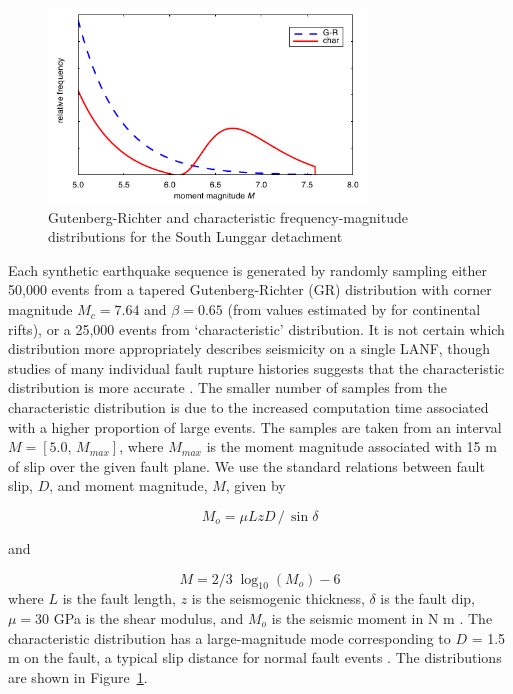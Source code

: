 \documentclass[twocolumn,grl]{AGUTeX}
\begin{document}
\begin{article}
\begin{figure}[b]
\noindent\includegraphics[width=20pc]{./figures/F-Ms.pdf}
\caption{Gutenberg-Richter and characteristic frequency-magnitude 
 		 distributions for the South Lunggar detachment}
\label{fig:fms}
\end{figure}

Each synthetic earthquake sequence is generated by randomly sampling either
50,000 events from a tapered Gutenberg-Richter (GR) distribution with corner
magnitude $M_c = 7.64$ and $\beta = 0.65$ (from values estimated by
\citet{birdkagan2004f_m} for continental rifts), or a 25,000 events from
`characteristic' distribution. It is not certain which distribution more
appropriately describes seismicity on a single LANF, though studies of many
individual fault rupture histories suggests that the characteristic
distribution is more accurate \citep{hecker2013eqdist}.  The smaller number of
samples from the characteristic distribution is due to the increased
computation time associated with a higher proportion of large events.  The
samples are taken from an interval $M = [5.0, \, M_{max}]$, where $M_{max}$ is
the moment magnitude associated with 15 m of slip over the given fault plane.
We use the standard relations between fault slip, $D$, and moment magnitude,
$M$, given by

\begin{equation}
 M_o = \mu L z D \,/ \, \sin \delta 
 \end{equation}

and

\begin{equation}
M = 2/3 \; \log_{10} (M_o) - 6
\end{equation}
where $L$ is the fault length, $z$ is the seismogenic thickness, $\delta$ is
the fault dip, $\mu = 30$ GPa is the shear modulus, and $M_o$ is the seismic
moment in N m \citep{kagan2003pepi}.  The characteristic distribution has
a large-magnitude mode corresponding to $D$ = 1.5 m on the fault, a typical
slip distance for normal fault events
\citep[e.g.][]{wesnousky2008displacement}.  The distributions are shown in
Figure~\ref{fig:fms}.


\end{article}
\end{document}
